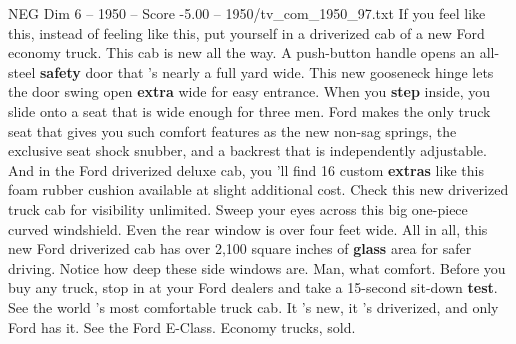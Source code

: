 \begin{textsample}{NEG Dim 6 – 1950 – Score -5.00 – 1950/tv\_com\_1950\_97.txt}  \label{ex:f6_neg_082}
If you feel like this, instead of feeling like this, put yourself in a driverized cab of a new Ford economy truck.
This cab is new all the way.
A push-button handle opens an all-steel \textbf{safety} door that 's nearly a full yard wide.
This new gooseneck hinge lets the door swing open \textbf{extra} wide for easy entrance.
When you \textbf{step} inside, you slide onto a seat that is wide enough for three men.
Ford makes the only truck seat that gives you such comfort features as the new non-sag springs, the exclusive seat shock snubber, and a backrest that is independently adjustable.
And in the Ford driverized deluxe cab, you 'll find 16 custom \textbf{extras} like this foam rubber cushion available at slight additional cost.
Check this new driverized truck cab for visibility unlimited.
Sweep your eyes across this big one-piece curved windshield.
Even the rear window is over four feet wide.
All in all, this new Ford driverized cab has over 2,100 square inches of \textbf{glass} area for safer driving.
Notice how deep these side windows are.
Man, what comfort.
Before you buy any truck, stop in at your Ford dealers and take a 15-second sit-down \textbf{test}.
See the world 's most comfortable truck cab.
It 's new, it 's driverized, and only Ford has it.
See the Ford E-Class.
Economy trucks, sold.

\end{textsample}
